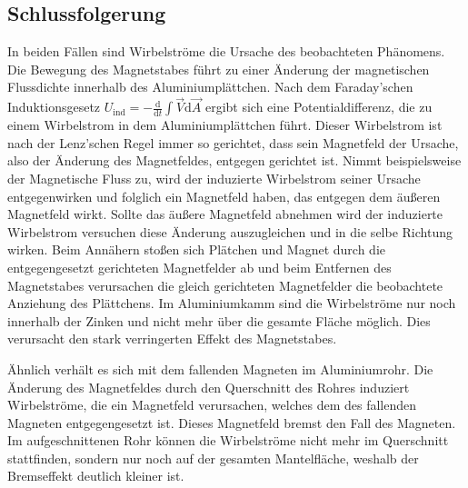 \documentclass[
	a4paper,
	12pt,
	pagesize,
	ngerman
]{scrartcl}
\begin{document}
	\subsection{Schlussfolgerung}
	In beiden Fällen sind Wirbelströme die Ursache des beobachteten Phänomens.
	Die Bewegung des Magnetstabes führt zu einer Änderung der magnetischen Flussdichte innerhalb des Aluminiumplättchen. Nach dem Faraday'schen Induktionsgesetz $U_\text{ind}= - \frac{\text{d}}{\text{d}t} \int \vec{V} \text{d} \vec{A}$ ergibt sich eine Potentialdifferenz, die zu einem Wirbelstrom in dem Aluminiumplättchen führt. Dieser Wirbelstrom ist nach der Lenz'schen Regel immer so gerichtet, dass sein Magnetfeld der Ursache, also der Änderung des Magnetfeldes, entgegen gerichtet ist. Nimmt beispielsweise der Magnetische Fluss zu, wird der induzierte Wirbelstrom seiner Ursache entgegenwirken und folglich ein Magnetfeld haben, das entgegen dem äußeren Magnetfeld wirkt. Sollte das äußere Magnetfeld abnehmen wird der induzierte Wirbelstrom versuchen diese Änderung auszugleichen und in die selbe Richtung wirken. 
	Beim Annähern stoßen sich Plätchen und Magnet durch die entgegengesetzt gerichteten Magnetfelder ab und beim Entfernen des Magnetstabes verursachen die gleich gerichteten Magnetfelder die beobachtete Anziehung des Plättchens.
	Im Aluminiumkamm sind die Wirbelströme nur noch innerhalb der Zinken und nicht mehr über die gesamte Fläche möglich. Dies verursacht den stark verringerten Effekt des Magnetstabes. \par
	Ähnlich verhält es sich mit dem fallenden Magneten im Aluminiumrohr. Die Änderung des Magnetfeldes durch den Querschnitt des Rohres induziert Wirbelströme, die ein Magnetfeld verursachen, welches dem des fallenden Magneten entgegengesetzt ist. Dieses Magnetfeld bremst den Fall des Magneten. Im aufgeschnittenen Rohr können die Wirbelströme nicht mehr im Querschnitt stattfinden, sondern nur noch auf der gesamten Mantelfläche, weshalb der Bremseffekt deutlich kleiner ist. %
\end{document}
